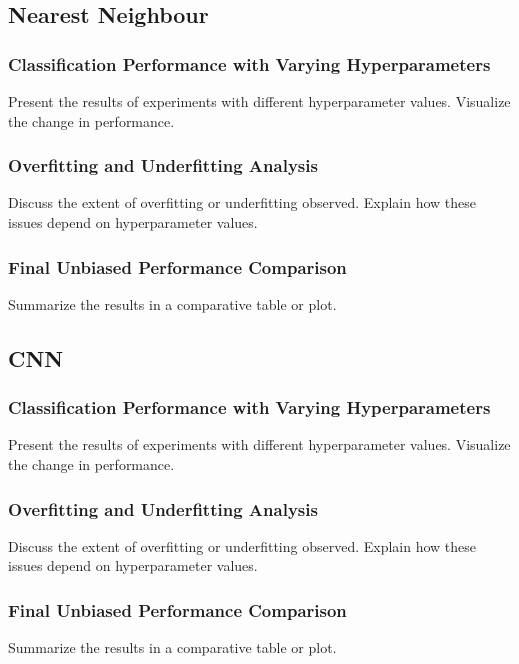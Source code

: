 \subsection{Nearest Neighbour}
\subsubsection{Classification Performance with Varying Hyperparameters}
Present the results of experiments with different hyperparameter values. Visualize the change in performance.
\subsubsection{Overfitting and Underfitting Analysis}
Discuss the extent of overfitting or underfitting observed. Explain how these issues depend on hyperparameter values.
\subsubsection{Final Unbiased Performance Comparison}
Summarize the results in a comparative table or plot.

\subsection{CNN}
\subsubsection{Classification Performance with Varying Hyperparameters}
Present the results of experiments with different hyperparameter values. Visualize the change in performance.
\subsubsection{Overfitting and Underfitting Analysis}
Discuss the extent of overfitting or underfitting observed. Explain how these issues depend on hyperparameter values.
\subsubsection{Final Unbiased Performance Comparison}
Summarize the results in a comparative table or plot.
